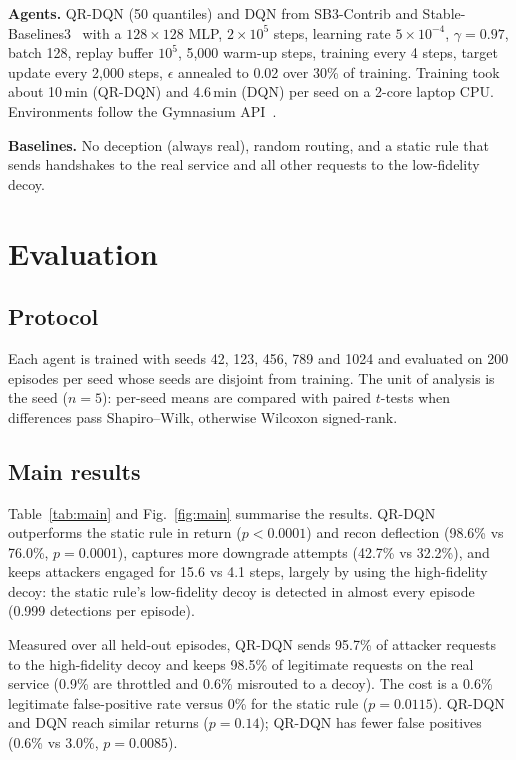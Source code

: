 \documentclass[conference]{IEEEtran}
\begin{document}
\textbf{Agents.} QR-DQN (50 quantiles) and DQN from SB3-Contrib and
Stable-Baselines3~\cite{sb3} with a $128\times128$ MLP, $2\times10^5$ steps,
learning rate $5\times10^{-4}$, $\gamma=0.97$, batch 128, replay buffer $10^5$,
5{,}000 warm-up steps, training every 4 steps, target update every 2{,}000 steps,
$\epsilon$ annealed to 0.02 over 30\% of training. Training took about 10\,min
(QR-DQN) and 4.6\,min (DQN) per seed on a 2-core laptop CPU. Environments follow the
Gymnasium API~\cite{gymnasium}.

\textbf{Baselines.} No deception (always real), random routing, and a static rule
that sends handshakes to the real service and all other requests to the
low-fidelity decoy.

\section{Evaluation}
\subsection{Protocol}
Each agent is trained with seeds 42, 123, 456, 789 and 1024 and evaluated on 200
episodes per seed whose seeds are disjoint from training. The unit of analysis is
the seed ($n=5$): per-seed means are compared with paired $t$-tests when
differences pass Shapiro--Wilk, otherwise Wilcoxon signed-rank.

\subsection{Main results}
Table~\ref{tab:main} and Fig.~\ref{fig:main} summarise the results. QR-DQN
outperforms the static rule in return ($p<0.0001$) and recon deflection
(98.6\% vs 76.0\%, $p=0.0001$), captures more downgrade attempts (42.7\% vs
32.2\%), and keeps attackers engaged for 15.6 vs 4.1 steps, largely by using the
high-fidelity decoy: the static rule's low-fidelity decoy is detected in almost
every episode (0.999 detections per episode).

Measured over all held-out
episodes, QR-DQN sends 95.7\% of attacker requests to the high-fidelity decoy and
keeps 98.5\% of legitimate requests on the real service (0.9\% are throttled and
0.6\% misrouted to a decoy). The cost is a 0.6\%
legitimate false-positive rate versus 0\% for the static rule ($p=0.0115$).
QR-DQN and DQN reach similar returns ($p=0.14$); QR-DQN has fewer false positives
(0.6\% vs 3.0\%, $p=0.0085$).
\end{document}
